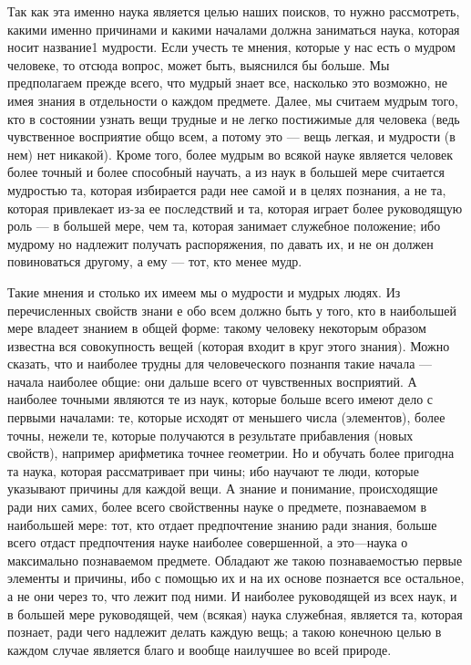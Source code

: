 \documentclass{article}
\begin{document}
Так как эта именно наука является целью наших поисков, то нужно рассмотреть, какими именно причинами и какими началами должна заниматься наука, которая носит название1  мудрости. Если учесть те мнения, которые у нас есть о мудром человеке, то отсюда вопрос, может быть, выяснился бы больше. Мы предполагаем прежде всего, что мудрый знает все, насколько это возможно, не имея знания в отдельности о каждом предмете. Далее, мы считаем мудрым того, кто в состоянии узнать вещи трудные и не легко постижимые для человека (ведь чувственное восприятие общо всем, а потому это — вещь легкая, и мудрости (в нем) нет никакой). Кроме того, более мудрым во всякой науке является человек более точный и более способный научать, а из наук в большей мере считается мудростью та, которая избирается ради нее самой и в целях познания, а не та, которая привлекает из-за ее последствий и та, которая играет более руководящую роль — в большей мере, чем та, которая занимает служебное положение; ибо мудрому но надлежит получать распоряжения, по давать их, и не он должен повиноваться другому, а ему — тот, кто менее мудр.

Такие мнения и столько их имеем мы о мудрости и мудрых людях. Из перечисленных свойств знани е обо всем должно быть у того, кто в наибольшей мере владеет знанием в общей форме: такому человеку некоторым образом
\footnotemark[1]
известна вся совокупность вещей (которая входит в круг этого знания).
\footnotemark[7]
Можно сказать, что и наиболее трудны для человеческого познанпя такие начала — начала наиболее общие: они дальше всего от чувственных восприятий. А наиболее точными являются те из наук, которые больше всего имеют дело с первыми началами: те, которые исходят от меньшего числа (элементов), более точны, нежели те, которые получаются в результате прибавления (новых свойств), например арифметика точнее геометрии.
\footnotemark[2]
Но и обучать более пригодна та наука, которая рассматривает при чины; ибо научают те люди, которые указывают причины для каждой вещи. А знание и понимание, происходящие ради них самих, более всего свойственны науке о предмете, познаваемом в наибольшей мере:
\footnotemark[7]
тот, кто отдает предпочтение знанию ради знания, больше всего отдаст предпочтения науке наиболее совершенной,
\footnotemark[8]
а это—наука о максимально познаваемом предмете. Обладают же такою познаваемостью первые элементы и причины, ибо с помощью их и на их основе познается все остальное, а не они через то, что лежит под ними.
\footnotemark[5]
И наиболее руководящей из всех наук, и в большей мере руководящей, чем (всякая) наука служебная, является та, которая познает, ради чего надлежит делать каждую вещь; а такою конечною целью в каждом случае является благо и вообще наилучшее во всей природе.
\end{document}
